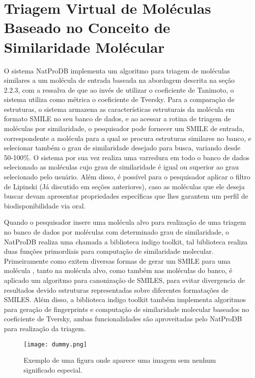 \section{Triagem Virtual de Moléculas Baseado no Conceito de Similaridade Molécular}

 O sistema NatProDB implementa um algoritmo para triagem de moléculas similares a um molécula de entrada baseada na abordagem descrita na seção 2.2.3, com a ressalva de que ao invés de utilizar o coeficiente de Tanimoto, o sistema utiliza como métrica o coeficiente de Tversky. Para a comparação de estruturas, o sistema armazena as características estruturais da molécula em formato SMILE no seu banco de dados, e ao acessar a rotina de triagem de moléculas por similaridade, o pesquisador pode fornecer  um SMILE de entrada, correspondente a molécula para a qual se procura estruturas similares no banco, e selecionar também o grau de similaridade desejado para busca, variando desde 50-100\%. O sistema por sua vez realiza uma varredura em todo o banco de dados selecionado as moléculas cujo grau de similaridade é igual ou superior ao grau selecionado pelo usuário. Além disso, é possível para o pesquisador aplicar o filtro de Lipinski (Já discutido em seções anteriores), caso as moléculas que ele deseja buscar devam apresentar propriedades específicas que lhes garantem um perfil de biodisponibilidade via oral.

Quando o pesquisador insere uma molécula alvo para realização de uma triagem no banco de dados por moléculas com determinado grau de similaridade, o NatProDB realiza uma chamada a biblioteca indigo toolkit, tal biblioteca realiza duas funções primordiais para computação de similaridade molecular. Primeiramente como exitem diversas formas de gerar um SMILE para uma molécula \cite{kumar2012}, tanto na molécula alvo, como também nas moléculas do banco, é aplicado um algoritmo para canonização de SMILES, para evitar divergencia de resultados devido estruturas representadas sobre diferentes formatações de SMILES. Além disso, a biblioteca indigo toolkit também implementa algoritmos para geração de fingerprints e computação de similaridade molecular baseados no coeficiente de Tversky, ambas funcionalidades são aproveitadas pelo NatProDB para realização da triagem.               

\begin{figure}[!htb]
	\centering
	\caption[Exemplo de uma figura]{Exemplo de uma figura onde aparece uma imagem sem nenhum significado especial.}
	\texttt{[image: dummy.png]} %
	\label{fig:dummy}
\end{figure}

